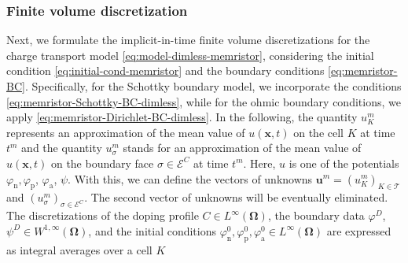 \documentclass[10pt,a4paper, final]{article}
\def\electrons{\text{n}}
\def\holes{\text{p}}
\def\ions{\text{a}}
\theoremstyle{definition}								%
\numberwithin{equation}{section}
\numberwithin{figure}{section}
\numberwithin{theorem}{section}
\begin{document}

\subsubsection{Finite volume discretization} \label{sec:FVM-discret}

Next, we formulate the implicit-in-time finite volume discretizations for the charge transport model \eqref{eq:model-dimless-memristor}, considering the initial condition \eqref{eq:initial-cond-memristor} and the boundary conditions \eqref{eq:memristor-BC}.
Specifically, for the  Schottky boundary model, we incorporate the conditions \eqref{eq:memristor-Schottky-BC-dimless}, while for the ohmic boundary conditions, we apply \eqref{eq:memristor-Dirichlet-BC-dimless}.
In the following, the quantity $u_K^{m}$ represents an approximation of the mean value of $u(\mathbf{x}, t)$ on the cell $K$ at time $t^{m}$ and the quantity $u_\sigma^m$ stands for an approximation of the mean value of $u(\mathbf{x}, t)$ on the boundary face $\sigma \in \mathcal{E}^C$ at time $t^m$.
Here, $u$ is one of the potentials $\varphi_{\electrons}, \varphi_{\holes}$, $\varphi_\ions$, $\psi$.
With this, we can define the vectors of unknowns $\boldsymbol{u}^m= (u_K^{m})_{K\in{\mathcal T}}$
and
$ (u_\sigma^{m})_{\sigma\in{\mathcal E}^C}$.
The second vector of unknowns will be eventually eliminated.
The discretizations of the doping profile $C \in L^{\infty} ( \mathbf{\Omega})$, the boundary data $\varphi^D$, $\psi^D \in W^{1, \infty} (\mathbf{\Omega})$, and the initial conditions  $\varphi_\electrons^0, \varphi_\holes^0, \varphi_\ions^0 \in L^{\infty} (\mathbf{\Omega})$ are expressed as integral averages over a cell $K$
\end{document}
